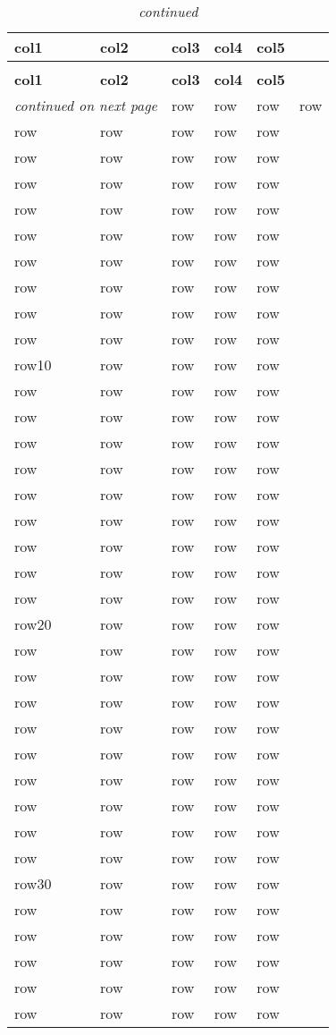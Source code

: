 \begin{longtable}{p{3cm}p{3cm}p{2cm}p{2.5cm}p{1.5cm}}
	\hline
	\textbf{col1} & \textbf{col2} & \textbf{col3}    & \textbf{col4}      & \textbf{col5}\\
	\hline
	\endfirsthead
	\caption[]{\emph{continued}}\\
	\hline
	\textbf{col1} & \textbf{col2} & \textbf{col3}    & \textbf{col4}      & \textbf{col5}\\
	\hline
	\endhead
	\hline
	\multicolumn{2}{r}{\emph{continued on next page}}
	\endfoot
	\hline
	\endlastfoot
	row1 & row & row    & row    & row\\
	row & row & row    & row    & row\\
	row & row & row    & row    & row\\
	row & row & row    & row    & row\\
	row & row & row    & row    & row\\
	row & row & row    & row    & row\\
	row & row & row    & row    & row\\
	row & row & row    & row    & row\\
	row & row & row    & row    & row\\
	row & row & row    & row    & row\\
	row10 & row & row    & row    & row\\
	row & row & row    & row    & row\\
	row & row & row    & row    & row\\
	row & row & row    & row    & row\\
	row & row & row    & row    & row\\
	row & row & row    & row    & row\\
	row & row & row    & row    & row\\
	row & row & row    & row    & row\\
	row & row & row    & row    & row\\
	row & row & row    & row    & row\\
	row20 & row & row    & row    & row\\
	row & row & row    & row    & row\\
	row & row & row    & row    & row\\
	row & row & row    & row    & row\\
	row & row & row    & row    & row\\
	row & row & row    & row    & row\\
	row & row & row    & row    & row\\
	row & row & row    & row    & row\\
	row & row & row    & row    & row\\
	row & row & row    & row    & row\\
	row30 & row & row    & row    & row\\
	row & row & row    & row    & row\\
	row & row & row    & row    & row\\
	row & row & row    & row    & row\\
	row & row & row    & row    & row\\
	row & row & row    & row    & row\\
	
\end{longtable}